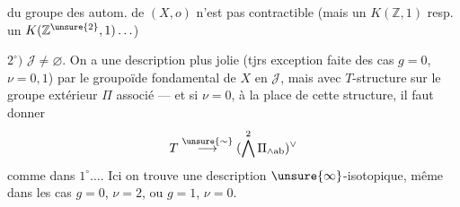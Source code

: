 du groupe des autom. de $(X,o)$
n'est pas contractible (mais un
$K(\mathbb Z,1)$ resp. un $K(\mathbb Z^{\unsure{2}},1)\ldots$)

$2^\circ)$ $\mathcal J\ne\varnothing$. On a une description
plus jolie (tjrs exception faite
des cas $g=0$, $\nu=0,1$) par le
groupoïde fondamental de $X$
en $\mathcal J$, mais avec $T$-structure
 sur le groupe extérieur
$\Pi$ associé --- et si $\nu=0$, à la place de
cette structure, il faut donner
\[
T\overset{\unsure{\sim}}{\longrightarrow}
(\bigwedge^2\Pi_{\wedge\mathrm{ab}})^\vee
\]
comme dans $1^\circ\ldots$. Ici on trouve
une description $\unsure{\infty}$-isotopique, même
dans les cas $g=0$, $\nu=2$, ou $g=1$, $\nu=0$.
